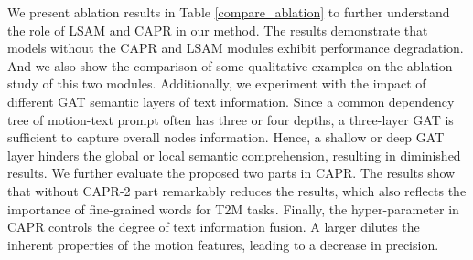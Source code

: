 \documentclass[10pt,twocolumn,letterpaper]{article}
\begin{document}
\begin{table}[t]
\centering
{}

\caption{Experiment results on Harder-HumanML3D split from the HumanML3D~\cite{guo2022generating} test set. }

\label{ablation}
\end{table}
We present ablation results in Table \ref{compare_ablation} to further understand the role of LSAM and CAPR in our method. The results demonstrate that models without the CAPR and LSAM modules exhibit performance degradation. And we also show the comparison of some qualitative examples on the ablation study of this two modules. Additionally, we experiment with the impact of different GAT semantic layers of text information. Since a common dependency tree of motion-text prompt often has three or four depths, a three-layer GAT is sufficient to capture overall nodes information. Hence, a shallow or deep GAT layer hinders the global or local semantic comprehension, resulting in diminished results. We further evaluate the proposed two parts in CAPR. The results show that without CAPR-2 part remarkably reduces the results, which also reflects the importance of fine-grained words for T2M tasks. Finally, the hyper-parameter  in CAPR controls the degree of text information fusion. A larger  dilutes the inherent properties of the motion features, leading to a decrease in precision.
\end{document}
